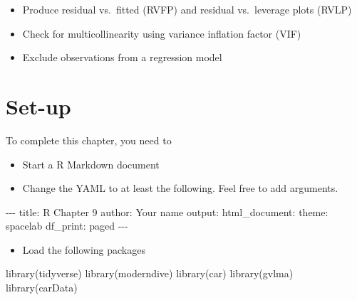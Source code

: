 \documentclass[
]{book}
\makeatletter
\newenvironment{Shaded}{\begin{snugshade}}{\end{snugshade}}
\newcommand{\FunctionTok}[1]{\textcolor[rgb]{0,0,0}{#1}}
\newcommand{\NormalTok}[1]{#1}
\newcommand{\SpecialCharTok}[1]{\textcolor[rgb]{0,0,0}{#1}}
\newcommand{\StringTok}[1]{\textcolor[rgb]{0.5,0.5,0.5}{#1}}
\providecommand{\tightlist}{%
  \setlength{\itemsep}{0pt}\setlength{\parskip}{0pt}}
\newenvironment{kframe}{%
\medskip{}
\setlength{\fboxsep}{.8em}
 \def\at@end@of@kframe{}%
 \ifinner\ifhmode%
  \def\at@end@of@kframe{\end{minipage}}%
  \begin{minipage}{\columnwidth}%
 \fi\fi%
 \def\FrameCommand##1{\hskip\@totalleftmargin \hskip-\fboxsep
 \colorbox{shadecolor}{##1}\hskip-\fboxsep
     \hskip-\linewidth \hskip-\@totalleftmargin \hskip\columnwidth}%
 \MakeFramed {\advance\hsize-\width
   \@totalleftmargin\z@ \linewidth\hsize
   \@setminipage}}%
 {\par\unskip\endMakeFramed%
 \at@end@of@kframe}
\renewenvironment{Shaded}{\begin{kframe}}{\end{kframe}}
\makeatother
\begin{document}
\begin{itemize}
\tightlist
\item
  Produce residual vs.~fitted (RVFP) and residual vs.~leverage plots (RVLP)
\item
  Check for multicollinearity using variance inflation factor (VIF)
\item
  Exclude observations from a regression model
\end{itemize}

\hypertarget{set-up}{%
\section{Set-up}\label{set-up}}

To complete this chapter, you need to

\begin{itemize}
\tightlist
\item
  Start a R Markdown document
\item
  Change the YAML to at least the following. Feel free to add arguments.
\end{itemize}

\begin{Shaded}
\begin{Highlighting}[]
\SpecialCharTok{{-}{-}{-}}
\NormalTok{title}\SpecialCharTok{:} \StringTok{\textquotesingle{}R Chapter 9\textquotesingle{}}
\NormalTok{author}\SpecialCharTok{:} \StringTok{\textquotesingle{}Your name\textquotesingle{}}
\NormalTok{output}\SpecialCharTok{:} 
\NormalTok{  html\_document}\SpecialCharTok{:}
\NormalTok{    theme}\SpecialCharTok{:}\NormalTok{ spacelab}
\NormalTok{    df\_print}\SpecialCharTok{:}\NormalTok{ paged}
\SpecialCharTok{{-}{-}{-}}
\end{Highlighting}
\end{Shaded}

\begin{itemize}
\tightlist
\item
  Load the following packages
\end{itemize}

\begin{Shaded}
\begin{Highlighting}[]
\FunctionTok{library}\NormalTok{(tidyverse)}
\FunctionTok{library}\NormalTok{(moderndive)}
\FunctionTok{library}\NormalTok{(car)}
\FunctionTok{library}\NormalTok{(gvlma)}
\FunctionTok{library}\NormalTok{(carData)}
\end{Highlighting}
\end{Shaded}
\end{document}
